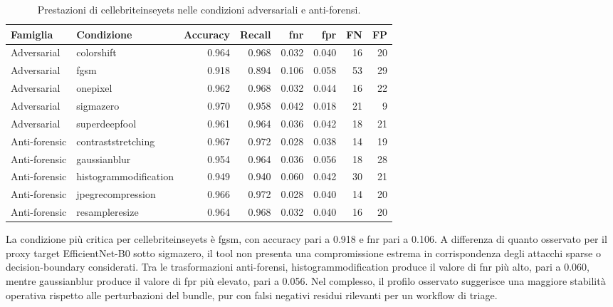 \begin{table}[H]
\centering
\caption{Prestazioni di \gls{cellebriteinseyets} nelle condizioni adversariali e anti-forensi.}
\label{tab:results-cellebrite-attack-metrics}
\scriptsize
\renewcommand{\arraystretch}{1.12}
\setlength{\tabcolsep}{4pt}
\begin{tabular}{@{}l l r r r r r r@{}}
\toprule
\textbf{Famiglia} & \textbf{Condizione} & \textbf{Accuracy} & \textbf{Recall} & \textbf{\gls{fnr}} & \textbf{\gls{fpr}} & \textbf{FN} & \textbf{FP} \\
\midrule
Adversarial & \gls{colorshift} & 0.964 & 0.968 & 0.032 & 0.040 & 16 & 20 \\
Adversarial & \gls{fgsm} & 0.918 & 0.894 & 0.106 & 0.058 & 53 & 29 \\
Adversarial & \gls{onepixel} & 0.962 & 0.968 & 0.032 & 0.044 & 16 & 22 \\
Adversarial & \gls{sigmazero} & 0.970 & 0.958 & 0.042 & 0.018 & 21 & 9 \\
Adversarial & \gls{superdeepfool} & 0.961 & 0.964 & 0.036 & 0.042 & 18 & 21 \\
\midrule
Anti-forensic & \gls{contraststretching} & 0.967 & 0.972 & 0.028 & 0.038 & 14 & 19 \\
Anti-forensic & \gls{gaussianblur} & 0.954 & 0.964 & 0.036 & 0.056 & 18 & 28 \\
Anti-forensic & \gls{histogrammodification} & 0.949 & 0.940 & 0.060 & 0.042 & 30 & 21 \\
Anti-forensic & \gls{jpegrecompression} & 0.966 & 0.972 & 0.028 & 0.040 & 14 & 20 \\
Anti-forensic & \gls{resampleresize} & 0.964 & 0.968 & 0.032 & 0.040 & 16 & 20 \\
\bottomrule
\end{tabular}
\end{table}

La condizione più critica per \gls{cellebriteinseyets} è \gls{fgsm}, con accuracy
pari a 0.918 e \gls{fnr} pari a 0.106. A differenza di quanto osservato per il
proxy target EfficientNet-B0 sotto \gls{sigmazero}, il tool non presenta una
compromissione estrema in corrispondenza degli attacchi sparse o decision-boundary
considerati. Tra le trasformazioni anti-forensi, \gls{histogrammodification}
produce il valore di \gls{fnr} più alto, pari a 0.060, mentre \gls{gaussianblur}
produce il valore di \gls{fpr} più elevato, pari a 0.056. Nel complesso, il
profilo osservato suggerisce una maggiore stabilità operativa rispetto alle
perturbazioni del bundle, pur con falsi negativi residui rilevanti per un
workflow di triage.

